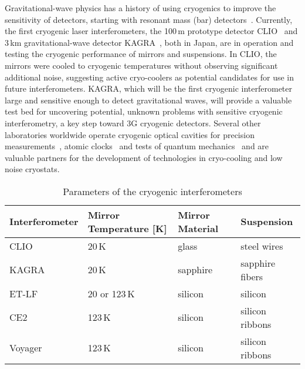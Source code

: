 Gravitational-wave physics has a history of using cryogenics to improve the sensitivity of detectors, starting with resonant mass (bar) detectors~\cite{ColdBars}. Currently, the first cryogenic laser interferometers, the 100\,m prototype detector \ac{CLIO}~\cite{CLIO:2008} and 3\,km gravitational-wave detector \ac{KAGRA}~\cite{KAGRA2013}, both in Japan, are in operation and testing the cryogenic performance of mirrors and suspensions. 
In CLIO, the mirrors were cooled to cryogenic temperatures without observing significant additional noise, suggesting active cryo-coolers as potential candidates for use in future interferometers. \ac{KAGRA}, which will be the first cryogenic interferometer large and sensitive enough to detect gravitational waves, will provide a valuable test bed for uncovering potential, unknown problems with sensitive cryogenic interferometry, a key step toward \ac{3G} cryogenic detectors. Several other laboratories worldwide operate cryogenic optical cavities for precision measurements~\cite{Mueller:03}, atomic clocks~\cite{JunYeGroup:2019} and tests of quantum mechanics~\cite{CaltechIQIM} and are valuable partners for the development of technologies in cryo-cooling and low noise cryostats. 

\begin{table}[h]
\centering
\begin{tabular}{ |l||l|l|l|  }
 \hline
 Interferometer & Mirror Temperature [K] & Mirror Material & Suspension \\
 \hline
 CLIO           &   20\,K           & glass     &  steel wires \\
 KAGRA          &   20\,K           & sapphire  &  sapphire fibers  \\
 ET-LF             &   20 or 123\,K    & silicon   &  silicon  \\
 CE2             &   123\,K          & silicon   &  silicon ribbons \\
 Voyager        &   123\,K          & silicon   &  silicon ribbons \\
 \hline
\end{tabular}
\caption[Cryo IFOs]{Parameters of the cryogenic interferometers}
\label{tab:CryoTemps}
\end{table}


